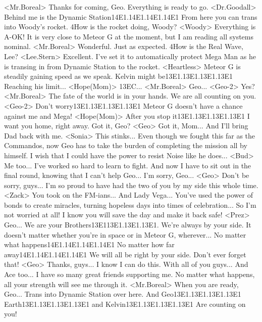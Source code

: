 <Mr.Boreal> Thanks for coming, Geo. Everything is ready to go. 
<Dr.Goodall> Behind me is the Dynamic Station{14}{E1}.{14}{E1}.{14}{E1}.{14}{E1} 
From here you can trans into Woody's rocket. 
4How is the rocket doing, Woody? 
<Woody> Everything is A-OK! 
It is very close to Meteor G at the moment, but I am reading all systems nominal. 
<Mr.Boreal> Wonderful. Just as expected. 
4How is the Real Wave, Lee? 
<Lee.Stern> Excellent. 
I've set it to automatically protect Mega Man as he is 
transing in from Dynamic Station to the rocket. 
<Heartless> Meteor G is steadily gaining speed as we speak. 
Kelvin might be{13}{E1}.{13}{E1}.{13}{E1}.{13}{E1} Reaching his limit... 
<Hope(Mom)> {13}{EC}... 
<Mr.Boreal> Geo... 
<Geo-2> Yes? 
<Mr.Boreal> The fate of the world is in your hands. 
We are all counting on you. 
<Geo-2> Don't worry{13}{E1}.{13}{E1}.{13}{E1}.{13}{E1} Meteor G doesn't have a chance against me and Mega! 
<Hope(Mom)> After you stop it{13}{E1}.{13}{E1}.{13}{E1}.{13}{E1} I want you home, right away. Got it, Geo? 
<Geo> Got it, Mom... 
And I'll bring Dad back with me. 
<Sonia> This stinks... 
Even though we fought this far as the Commandos, now 
Geo has to take the burden of completing the mission all by himself. 
I wish that I could have the power to resist Noise like he does... 
<Bud> Me too... 
I've worked so hard to learn to fight. And now I have to sit out in the final round,  
knowing that I can't help Geo... 
I'm sorry, Geo... 
<Geo> Don't be sorry, guys... 
I'm so proud to have had the two of you by my side this whole time. 
<Zack> You took on the FM-ians... And Lady Vega... 
You've used the power of bonds to create miracles, 
turning hopeless days into times of celebration... 
So I'm not worried at all! 
I know you will save the day and make it back safe! 
<Prez> Geo... We are your Brothers{13}{E1}{13}{E1}.{13}{E1}.{13}{E1}. We're always by your side. 
It doesn't matter whether you're in space or in Meteor G, wherever... 
No matter what happens{14}{E1}.{14}{E1}.{14}{E1}.{14}{E1} 
No matter how far away{14}{E1}.{14}{E1}.{14}{E1}.{14}{E1} 
We will all be right by your side. 
Don't ever forget that! 
<Geo> Thanks, guys... 
I know I can do this. 
With all of you guys... And Ace too... 
I have so many great friends supporting me. 
No matter what happens,  all your strength will see me through it. 
<Mr.Boreal> When you are ready, Geo... 
Trans into Dynamic Station over here. 
And Geo{13}{E1}.{13}{E1}.{13}{E1}.{13}{E1} Earth{13}{E1}.{13}{E1}.{13}{E1}.{13}{E1} and Kelvin{13}{E1}.{13}{E1}.{13}{E1}.{13}{E1} Are counting on you! 
